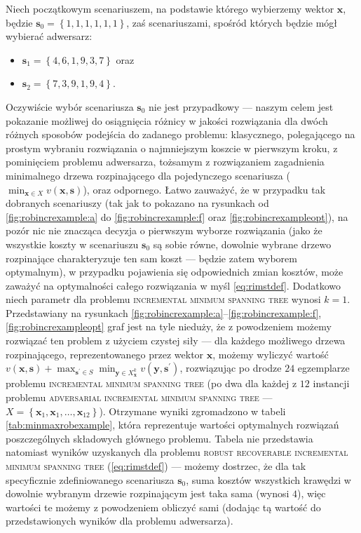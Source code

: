 Niech początkowym scenariuszem, na podstawie którego wybierzemy wektor $\textbf{x}$, będzie $\textbf{s}_{0} = \left\{ 1, 1, 1, 1, 1, 1 \right\}$, zaś scenariuszami, spośród których będzie mógł wybierać adwersarz:
\begin{itemize}
	\item $\textbf{s}_{1} = \left\{ 4, 6, 1, 9, 3, 7 \right\}$ oraz
	\item $\textbf{s}_{2} = \left\{ 7, 3, 9, 1, 9, 4 \right\}$.
\end{itemize}
Oczywiście wybór scenariusza $\textbf{s}_{0}$ nie jest przypadkowy --- naszym celem jest pokazanie możliwej do osiągnięcia różnicy w jakości rozwiązania dla dwóch różnych sposobów podejścia do zadanego problemu: klasycznego, polegającego na prostym wybraniu rozwiązania o najmniejszym koszcie w pierwszym kroku, z pominięciem problemu adwersarza, tożsamym z rozwiązaniem zagadnienia minimalnego drzewa rozpinającego dla pojedynczego scenariusza ($\min_{\textbf{x} \in X} v \left( \textbf{x}, \textbf{s} \right)$), oraz odpornego. Łatwo zauważyć, że w przypadku tak dobranych scenariuszy (tak jak to pokazano na rysunkach od \ref{fig:robincrexample:a} do \ref{fig:robincrexample:f} oraz \ref{fig:robincrexampleopt}), na pozór nic nie znacząca decyzja o pierwszym wyborze rozwiązania (jako że wszystkie koszty w scenariuszu $\textbf{s}_{0}$ są sobie równe, dowolnie wybrane drzewo rozpinające charakteryzuje ten sam koszt --- będzie zatem wyborem optymalnym), w przypadku pojawienia się odpowiednich zmian kosztów, może zaważyć na optymalności całego rozwiązania w myśl \ref{eq:rimstdef}. Dodatkowo niech parametr dla problemu \textsc{incremental minimum spanning tree} wynosi $k = 1$. Przedstawiany na rysunkach \ref{fig:robincrexample:a}--\ref{fig:robincrexample:f}, \ref{fig:robincrexampleopt} graf jest na tyle nieduży, że z powodzeniem możemy rozwiązać ten problem z użyciem czystej siły --- dla każdego możliwego drzewa rozpinającego, reprezentowanego przez wektor $\textbf{x}$, możemy wyliczyć wartość $v \left( \textbf{x}, \textbf{s} \right) + \max_{\textbf{s}^{\prime} \in S} \min_{\textbf{y} \in X^{k}_{\textbf{x}}} v \left( \textbf{y}, \textbf{s}^{\prime} \right)$, rozwiązując po drodze $24$ egzemplarze problemu \textsc{incremental minimum spanning tree} (po dwa dla każdej z $12$ instancji problemu \textsc{adversarial incremental minimum spanning tree} --- $X = \left\{ \textbf{x}_{1}, \textbf{x}_{1}, \dots, \textbf{x}_{12} \right\}$). Otrzymane wyniki zgromadzono w tabeli \ref{tab:minmaxrobexample}, która reprezentuje wartości optymalnych rozwiązań poszczególnych składowych głównego problemu. Tabela nie przedstawia natomiast wyników uzyskanych dla problemu \textsc{robust recoverable incremental minimum spanning tree} (\ref{eq:rimstdef}) --- możemy dostrzec, że dla tak specyficznie zdefiniowanego scenariusza $\textbf{s}_{0}$, suma kosztów wszystkich krawędzi w dowolnie wybranym drzewie rozpinającym jest taka sama (wynosi $4$), więc wartości te możemy z powodzeniem obliczyć sami (dodając tą wartość do przedstawionych wyników dla problemu adwersarza).

